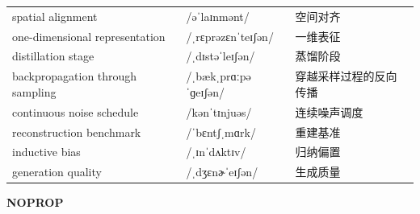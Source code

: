 \documentclass[UTF8,12pt,a4paper]{ctexart}
\providecommand{\zh}[1]{#1}
\begin{document}
\begin{tabular*}{\textwidth}{@{\extracolsep{\fill}}lll@{}}
spatial alignment & {\ipafont /əˈlaɪnmənt/} & \zh{空间对齐} \\
one-dimensional representation & {\ipafont /ˌrɛprəzɛnˈteɪʃən/} & \zh{一维表征} \\
distillation stage & {\ipafont /ˌdɪstəˈleɪʃən/} & \zh{蒸馏阶段} \\
backpropagation through sampling & {\ipafont /ˌbækˌprɑːpəˈɡeɪʃən/} & \zh{穿越采样过程的反向传播} \\
continuous noise schedule & {\ipafont /kənˈtɪnjuəs/} & \zh{连续噪声调度} \\
reconstruction benchmark & {\ipafont /ˈbɛntʃˌmɑrk/} & \zh{重建基准} \\
inductive bias & {\ipafont /ˌɪnˈdʌktɪv/} & \zh{归纳偏置} \\
generation quality & {\ipafont /ˌdʒɛnɚˈeɪʃən/} & \zh{生成质量} \\
\bottomrule
\end{tabular*}

\newpage

\begin{center}
    {\Large\bfseries NOPROP}
\end{center}
\end{document}
